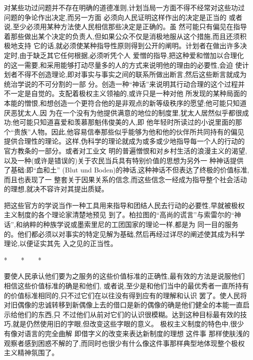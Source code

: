 ﻿\documentclass[12pt]{article}
\begin{document}
对某些功过问题并不存在明确的道德准则,计划当局一方面不得不经常对这些功过问题的争论作出决定,而另一方面
必须向人民证明这样作出的决定是正当的 \myrule 或者说,至少必须用某种方法使人民相信那些决定是正确的。虽
然可能只有偏见在指导着那些做出某个决定的负责人,但如果公众不仅是消极地服从这个措施,而且还须积极地支持
它的话,就必须使某种指导性原则得到公开的阐明。计划者在做出许多决定时,由于缺乏其它任何根据,必须听凭个人
爱憎的指导,把这种爱和憎加以合理化的这一需要,和采用能够打动尽量多的人的方式来说明他的理由的必要性,会迫
使计划者不得不创造理论,即对事实与事实之间的联系所做出断言,然后这些断言就成为统治学说的不可分割的一部
分。创造一种``神话''来说明其行动合理的这个过程并不一定是自觉的。支配着极权主义领袖的,或许只是一种对他
所发现的某种局面的本能的憎恨,和想创造一个更符合他的是非观点的新等级秩序的愿望;他可能只知道厌恶犹太人,因
为在一个没有为他提供满意的地位的制度里,犹太人居然似乎都很成功;他可能只知道喜爱和羡慕那魁伟俊美的人,即
他年轻时所读过的小说里面的那个``贵族''人物。因此,他容易信奉那些似乎能够为他和他的伙伴所共同持有的偏见
提供合理性的理论。这样,伪科学的理论就成为或多或少地指导每一个人的行动的官方教条的一部分。或者对工业文
明的普遍憎恨和对乡村生活的浪漫主义的渴望,以及一种(或许是错误的)关于农民当兵具有特别价值的思想为另外一
种神话提供了基础:即``血和土'' (Blut und Boden)的神话,这种神话不但表达了终极的价值标准,而且也表现了一
整套关于因果关系的信念,而这些信念一经成为指导整个社会活动的理想,就决不容许对其提出质疑。

把这些官方的学说当作一种工具用来指导和团结人民去行动的必要性,早就被极权主义制度的各个理论家清楚地预见
到了。柏拉图的``高尚的谎言''与索雷尔的``神话'',和纳粹的种族学说或墨索里尼的工团国家的理论一样,都是为
同一目的服务的。他们都必须以对事实的特定见解为基础,然后再经过详尽的阐述使其成为科学理论,以便证实其先
入之见的正当性。

*　　*　　*

要使人民承认他们要为之服务的这些价值标准的正确性,最有效的方法是说服他们相信这些价值标准的确是和他们,
或者说,至少是和他们当中的最优秀者一直所持有的价值标准相同的,只不过它们在以往没有得到应有的理解和认识
罢了。使人民将对旧偶像的忠诚转移到新偶像上去的借口是新的偶像的确是他们健全的本能一直启示给他们的东西,只
不过他们从前对它们的认识很模糊。达到这种目标最有效的技巧,就是仍然使用旧的字眼,但改变这些字眼的意义。
极权主义制度的特色中,很少有像对语言的完全曲解 \myrule 即借字义的改变来表达新制度的理想 \myrule 这件事
那样使肤浅的观察者感到困惑不解的了,而同时也很少有什么像这件事那样典型地体现整个极权主义精神氛围了。
\end{document}
